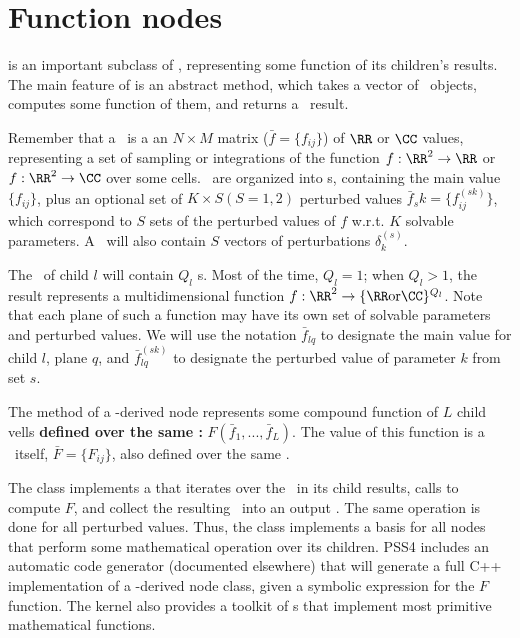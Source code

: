 \section{Function nodes}
\label{sec:Function}

   is an important subclass of , representing some
  function of its children's results. The main feature of  is an
  abstract  method, which takes a vector of \Vells\ objects,
  computes some function of them, and returns a \Vells\ result.

  Remember that a \Vells\ is a an $N\times M$ matrix ($\bar{f}=\{f_{ij}\}$) of
  $\RR$ or $\CC$ values, representing a set of sampling or integrations of the
  function $f:\RR^2\rightarrow\RR$ or $f:\RR^2\rightarrow\CC$ over some cells.
  \Vells\ are organized into \VellSet{}s, containing the main value $\{f_{ij}\}$,
  plus an optional set of $K\times S (S=1,2)$ perturbed values $\bar{f}_sk =
  \{f^{(sk)}_{ij}\}$, which correspond to $S$ sets of the perturbed values of $f$
  w.r.t. $K$ solvable parameters. A \VellSet\ will also contain $S$ vectors of
  perturbations ${\delta^{(s)}_k}$.

  The \Result\ of child $l$ will contain $Q_l$ \VellSet{}s. Most of the time,
  $Q_l=1$; when $Q_l>1$, the result represents a multidimensional function
  $f:\RR^2\rightarrow\{\RR \mbox{or} \CC\}^{Q_l}$. Note that each plane of such
  a function may have its own set of solvable parameters and perturbed values.
  We will use the notation $\bar{f}_{lq}$ to designate the main value for child
  $l$, plane $q$, and $\bar{f}^{(sk)}_{lq}$ to designate the perturbed value of
  parameter $k$ from set $s$.
  
  The  method of a -derived node represents some
  compound function of $L$ child vells {\bf defined over the same \Cells:}
  $F(\bar{f}_1,...,\bar{f}_L)$. The value of this function is a \Vells\ itself,
  $\bar{F} = \{F_{ij}\}$, also defined over the same \Cells. 
  
  The  class implements a  that iterates over the
  \Vells\ in its child results, calls  to compute $F$, and
  collect the resulting \Vells\ into an output \Result. The same operation is
  done for all perturbed values. Thus, the  class implements a
  basis for all nodes that perform some mathematical operation over its
  children. PSS4 includes an automatic code generator (documented elsewhere)
  that will generate a full C++ implementation of a -derived node
  class, given a symbolic expression for the $F$ function. The kernel also
  provides a toolkit of s that implement most primitive
  mathematical functions.

